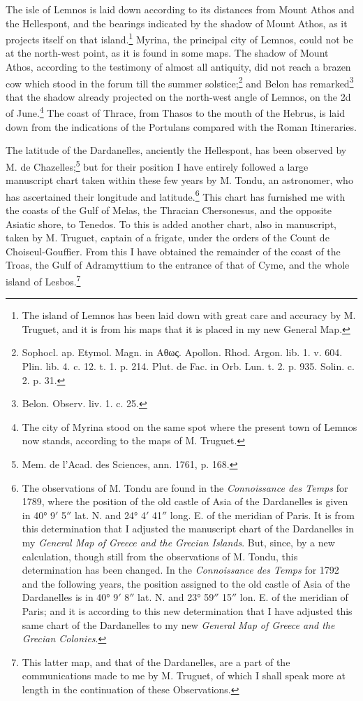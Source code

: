 \documentclass[a4paper, 11pt, oneside, polutonikogreek, english]{article}
\begin{document}
The isle of Lemnos is laid down according to its distances from Mount Athos and the Hellespont, and the bearings indicated by the shadow of Mount Athos, as it projects itself on that island.\footnote{The island of Lemnos has been laid down with great care and accuracy by M. Truguet, and it is from his maps that it is placed in my new General Map.} Myrina, the principal city of Lemnos, could not be at the north-west point, as it is found in some maps. The shadow of Mount Athos, according to the testimony of almost all antiquity, did not reach a brazen cow which stood in the forum till the summer solstice;\footnote{Sophocl. ap. Etymol. Magn. in Αθως. Apollon. Rhod. Argon. lib. 1. v. 604. Plin. lib. 4. c. 12. t. 1. p. 214. Plut. de Fac. in Orb. Lun. t. 2. p. 935. Solin. c. 2. p. 31.} and Belon has remarked\footnote{Belon. Observ. liv. 1. c. 25.} that the shadow already projected on the north-west angle of Lemnos, on the 2d of June.\footnote{The city of Myrina stood on the same spot where the present town of Lemnos now stands, according to the maps of M. Truguet.} The coast of Thrace, from Thasos to the mouth of the Hebrus, is laid down from the indications of the Portulans compared with the Roman Itineraries.

The latitude of the Dardanelles, anciently the Hellespont, has been observed by M. de Chazelles;\footnote{Mem. de l'Acad. des Sciences, ann. 1761, p. 168.} but for their position I have entirely followed a large manuscript chart taken within these few years by M. Tondu, an astronomer, who has ascertained their longitude and latitude.\footnote{The observations of M. Tondu are found in the \emph{Connoissance des Temps} for 1789, where the position of the old castle of Asia of the Dardanelles is given in 40° 9$'$ 5$''$ lat. N. and 24° 4$'$ 41$''$ long. E. of the meridian of Paris. It is from this determination that I adjusted the manuscript chart of the Dardanelles in my \emph{General Map of Greece and the Grecian Islands}. But, since, by a new calculation, though still from the observations of M. Tondu, this determination has been changed. In the \emph{Connoissance des Temps} for 1792 and the following years, the position assigned to the old castle of Asia of the Dardanelles is in 40° 9$'$ 8$''$ lat. N. and 23° 59$''$ 15$''$ lon. E. of the meridian of Paris; and it is according to this new determination that I have adjusted this same chart of the Dardanelles to my new \emph{General Map of Greece and the Grecian Colonies}.} This chart has furnished me with the coasts of the Gulf of Melas, the Thracian Chersonesus, and the opposite Asiatic shore, to Tenedos. To this is added another chart, also in manuscript, taken by M. Truguet, captain of a frigate, under the orders of the Count de Choiseul-Gouffier. From this I have obtained the remainder of the coast of the Troas, the Gulf of Adramyttium to the entrance of that of Cyme, and the whole island of Lesbos.\footnote{This latter map, and that of the Dardanelles, are a part of the communications made to me by M. Truguet, of which I shall speak more at length in the continuation of these Observations.}
\end{document}
